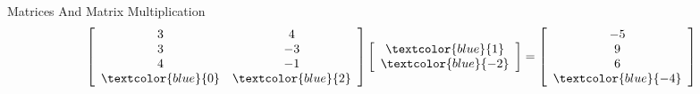 \begin{frame}{Matrices And Matrix Multiplication}
\[ \left[ \begin{array}{cc} 3 & 4  \\ 3 & -3  \\ 4 & -1  \\ \textcolor{blue}{ 0 } & \textcolor{blue}{ 2 } \end{array} \right]  \left[ \begin{array}{c} \textcolor{blue}{ 1 }  \\ \textcolor{blue}{ -2 } \end{array} \right]   =  \left[ \begin{array}{c} -5  \\ 9  \\ 6  \\ \textcolor{blue}{ -4 } \end{array} \right]  \]
\end{frame}


